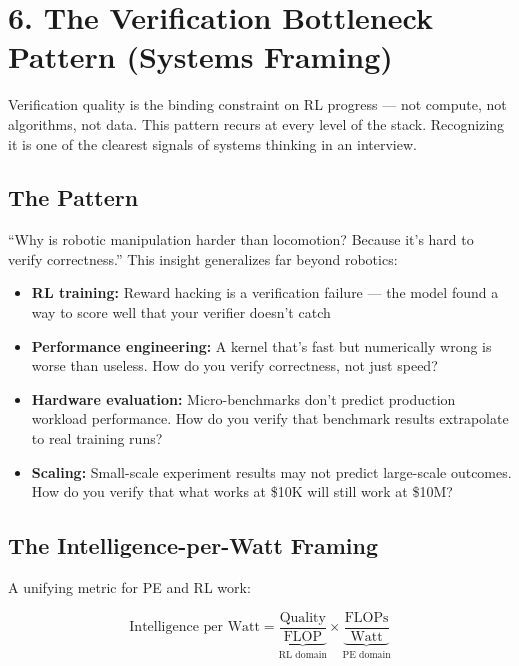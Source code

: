 \section{6. The Verification Bottleneck Pattern (Systems Framing)}

\begin{bluf}
Verification quality is the binding constraint on RL progress --- not compute, not algorithms, not data. This pattern recurs at every level of the stack. Recognizing it is one of the clearest signals of systems thinking in an interview.
\end{bluf}

\subsection{The Pattern}

``Why is robotic manipulation harder than locomotion? Because it's hard to verify correctness.'' This insight generalizes far beyond robotics:

\begin{itemize}
  \item \textbf{RL training:} Reward hacking is a verification failure --- the model found a way to score well that your verifier doesn't catch
  \item \textbf{Performance engineering:} A kernel that's fast but numerically wrong is worse than useless. How do you verify correctness, not just speed?
  \item \textbf{Hardware evaluation:} Micro-benchmarks don't predict production workload performance. How do you verify that benchmark results extrapolate to real training runs?
  \item \textbf{Scaling:} Small-scale experiment results may not predict large-scale outcomes. How do you verify that what works at \$10K will still work at \$10M?
\end{itemize}

\subsection{The Intelligence-per-Watt Framing}

A unifying metric for PE and RL work:

\[
\text{Intelligence per Watt} = \underbrace{\frac{\text{Quality}}{\text{FLOP}}}_{\text{RL domain}} \times \underbrace{\frac{\text{FLOPs}}{\text{Watt}}}_{\text{PE domain}}
\]

